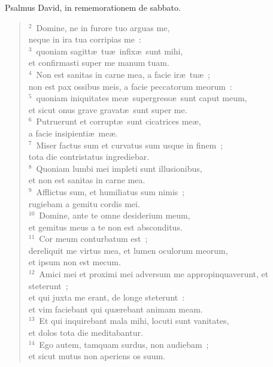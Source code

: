 \lettrine[lines=3,image=true,loversize=0.05,lraise=-0.03]{P}{}salmus David, in rememorationem de sabbato.
\begin{flushleft}\begin{verse}\vspace{6pt}${}^{2}$~Domine, ne in furore tuo arguas me,\\ neque in ira tua corripias me~:\\
${}^{3}$~quoniam sagitt\ae\ tu\ae\ infix\ae\ sunt mihi,\\ et confirmasti super me manum tuam.\\
${}^{4}$~Non est sanitas in carne mea, a facie ir\ae\ tu\ae~;\\ non est pax ossibus meis, a facie peccatorum meorum~:\\
${}^{5}$~quoniam iniquitates me\ae\ supergress\ae\ sunt caput meum,\\ et sicut onus grave gravat\ae\ sunt super me.\\
${}^{6}$~Putruerunt et corrupt\ae\ sunt cicatrices me\ae ,\\ a facie insipienti\ae\ me\ae .\\
${}^{7}$~Miser factus sum et curvatus sum usque in finem~;\\ tota die contristatus ingrediebar.\\
${}^{8}$~Quoniam lumbi mei impleti sunt illusionibus,\\ et non est sanitas in carne mea.\\
${}^{9}$~Afflictus sum, et humiliatus sum nimis~;\\ rugiebam a gemitu cordis mei.\\
${}^{10}$~Domine, ante te omne desiderium meum,\\ et gemitus meus a te non est absconditus.\\
${}^{11}$~Cor meum conturbatum est~;\\ dereliquit me virtus mea, et lumen oculorum meorum,\\ et ipsum non est mecum.\\
${}^{12}$~Amici mei et proximi mei adversum me appropinquaverunt, et steterunt~;\\ et qui juxta me erant, de longe steterunt~:\\ et vim faciebant qui qu\ae rebant animam meam.\\
${}^{13}$~Et qui inquirebant mala mihi, locuti sunt vanitates,\\ et dolos tota die meditabantur.\\
${}^{14}$~Ego autem, tamquam surdus, non audiebam~;\\ et sicut mutus non aperiens os suum.\\

\end{verse}
\end{flushleft}
